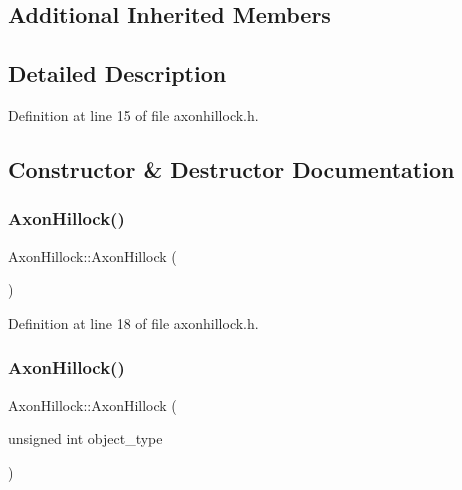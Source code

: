 \subsection*{Additional Inherited Members}


\subsection{Detailed Description}


Definition at line 15 of file axonhillock.\+h.



\subsection{Constructor \& Destructor Documentation}
\mbox{\label{class_axon_hillock_a432095dfb25ece393cdd83b5eb4f097a}} 
\subsubsection{\texorpdfstring{Axon\+Hillock()}{AxonHillock()}\hspace{0.1cm}{\footnotesize\ttfamily [1/4]}}
{\footnotesize\ttfamily Axon\+Hillock\+::\+Axon\+Hillock (\begin{DoxyParamCaption}{ }\end{DoxyParamCaption})\hspace{0.3cm}{\ttfamily [inline]}}



Definition at line 18 of file axonhillock.\+h.

\mbox{\label{class_axon_hillock_a20a4da0885f32bfca34ab5cda2a13562}} 
\subsubsection{\texorpdfstring{Axon\+Hillock()}{AxonHillock()}\hspace{0.1cm}{\footnotesize\ttfamily [2/4]}}
{\footnotesize\ttfamily Axon\+Hillock\+::\+Axon\+Hillock (\begin{DoxyParamCaption}\item[{unsigned int}]{object\+\_\+type }\end{DoxyParamCaption})\hspace{0.3cm}{\ttfamily [inline]}}



